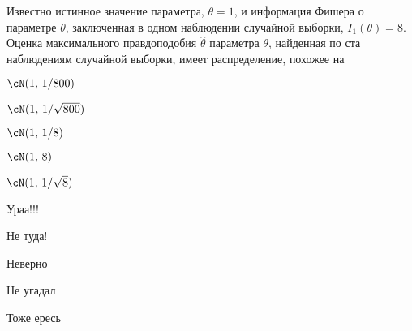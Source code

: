 
\begin{question}
Известно истинное значение параметра, \(\theta=1\), и информация Фишера
о параметре \(\theta\), заключенная в одном наблюдении случайной
выборки, \(I_1(\theta) = 8\). Оценка максимального правдоподобия
\(\hat \theta\) параметра \(\theta\), найденная по ста наблюдениям
случайной выборки, имеет распределение, похожее на
\begin{answerlist}
  \item \(\cN(1, \, 1/800)\)
  \item \(\cN(1, \, 1/\sqrt{800})\)
  \item \(\cN(1, \, 1/8)\)
  \item \(\cN(1, \, 8)\)
  \item \(\cN(1, \, 1/\sqrt{8})\)
\end{answerlist}
\end{question}

\begin{solution}
\begin{answerlist}
  \item Ураа!!!
  \item Не туда!
  \item Неверно
  \item Не угадал
  \item Тоже ересь
\end{answerlist}
\end{solution}

